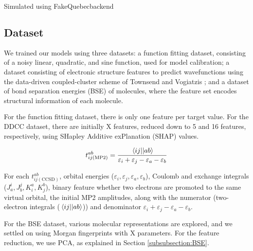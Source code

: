 \documentclass[journal=jacsat,manuscript=article]{achemso}
\begin{document}
Simulated using FakeQuebecbackend

\subsection{Dataset}
We trained our models using three datasets: a function fitting dataset, consisting of a noisy linear, quadratic, and sine function, used for model calibration; a dataset consisting of electronic structure features to predict wavefunctions using the data-driven coupled-cluster scheme of Townsend and Vogiatzis \cite{townsend_data-driven_2019}; and a dataset of bond separation energies (BSE) of molecules, where the feature set encodes structural information of each molecule. 

For the function fitting dataset, there is only one feature per target value.
For the DDCC dataset, there are initially X features, reduced down to 5 and 16 features, respectively, using SHapley Additive exPlanation (SHAP) values.\cite{lundberg_unified_2017} 


\begin{equation}
	t^{ab}_{ij(\text{MP2})} = \frac{\mel{ij}{}{ab}}{\varepsilon_{i}+\varepsilon_{j}-\varepsilon_{a}-\varepsilon_{b}}
	\label{eq:MP2_t2}
\end{equation}

For each $t^{ab}_{ij(\text{CCSD})}$, orbital energies ($\varepsilon_{i},\varepsilon_{j},\varepsilon_{a},\varepsilon_{b}$), Coulomb and exchange integrals ($J^{i}_{a},J^{j}_{b},K^{a}_{i},K^{b}_{j}$), binary feature whether two electrons are promoted to the same virtual orbital, the initial MP2 amplitudes, along with the numerator (two-electron integrals ($\mel{ij}{}{ab}$)) and denominator $\varepsilon_{i}+\varepsilon_{j}-\varepsilon_{a}-\varepsilon_{b}$.



For the BSE dataset, various molecular representations are explored, and we settled on using Morgan fingerprints with X parameters. 
For the feature reduction, we use PCA, as explained in Section \ref{subsubsection:BSE}.




\end{document}
